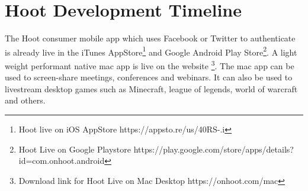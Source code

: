 \documentclass{article}
\begin{document}
\section{Hoot Development Timeline}
The Hoot consumer mobile app which uses Facebook or Twitter to authenticate is already live in the iTunes AppStore\footnote{Hoot live on iOS AppStore https://appsto.re/us/40RS-.i} and Google Android Play Store\footnote{Hoot Live on Google Playstore https://play.google.com/store/apps/details?id=com.onhoot.android}.
A light weight performant native  mac app is live on
the website \footnote{Download link for Hoot Live on Mac Desktop https://onhoot.com/mac}. The mac app can be used to screen-share meetings, conferences and webinars. It can also be used
to livestream desktop games such as Minecraft, league of legends,
world of warcraft and others.
\end{document}

